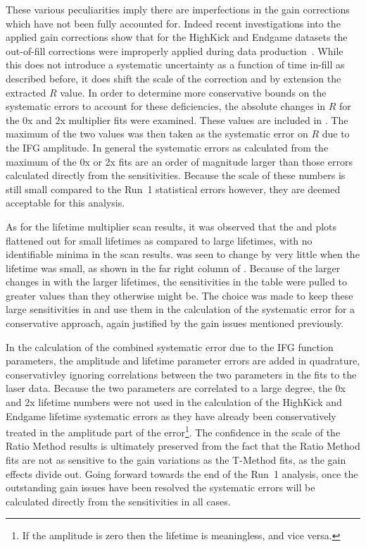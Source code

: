 These various peculiarities imply there are imperfections in the gain corrections which have not been fully accounted for. Indeed recent investigations into the applied gain corrections show that for the HighKick and Endgame datasets the out-of-fill corrections were improperly applied during data production~\cite{GainOscEndgameHighKick}. While this does not introduce a systematic uncertainty as a function of time in-fill as described before, it does shift the scale of the correction and by extension the extracted $R$ value. In order to determine more conservative bounds on the systematic errors to account for these deficiencies, the absolute changes in $R$ for the 0x and 2x multiplier fits were examined. These values are included in . The maximum of the two values was then taken as the systematic error on $R$ due to the IFG amplitude. In general the systematic errors as calculated from the maximum of the 0x or 2x fits are an order of magnitude larger than those errors calculated directly from the sensitivities. Because the scale of these numbers is still small compared to the Run~1 statistical errors however, they are deemed acceptable for this analysis. 

As for the lifetime multiplier scan results, it was observed that the \R and \chisq plots flattened out for small lifetimes as compared to large lifetimes, with no identifiable minima in the scan results. \R was seen to change by very little when the lifetime was small, as shown in the far right column of . Because of the larger changes in \R with the larger lifetimes, the sensitivities in the table were pulled to greater values than they otherwise might be. The choice was made to keep these large sensitivities in and use them in the calculation of the systematic error for a conservative approach, again justified by the gain issues mentioned previously.

In the calculation of the combined systematic error due to the IFG function parameters, the amplitude and lifetime parameter errors are added in quadrature, conservativley ignoring correlations between the two parameters in the fits to the laser data. Because the two parameters are correlated to a large degree, the 0x and 2x lifetime numbers were not used in the calculation of the HighKick and Endgame lifetime systematic errors as they have already been conservatively treated in the amplitude part of the error\footnote{If the amplitude is zero then the lifetime is meaningless, and vice versa.}. The confidence in the scale of the Ratio Method results is ultimately preserved from the fact that the Ratio Method fits are not as sensitive to the gain variations as the T-Method fits, as the gain effects divide out. Going forward towards the end of the Run~1 analysis, once the outstanding gain issues have been resolved the systematic errors will be calculated directly from the sensitivities in all cases.


